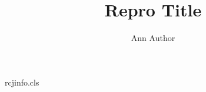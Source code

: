 \begin{filecontents*}[overwrite]{rcjinfo.cls}
\def\@jinfo{}
\newcommand{\jinfo}[1]{\def\@jinfo{#1}}
\def\@maketitle{\undefinedthing\@title\par\@author\par{\bfseries\@jinfo\par}}
\end{filecontents*}
\documentclass{rcjinfo}
\title{Repro Title}\author{Ann Author}

\maketitle
\begin{center}Department of Repro, University of Witness\end{center}
\begin{abstract}Abstract words here.\end{abstract}
\section{Intro}Body text.

